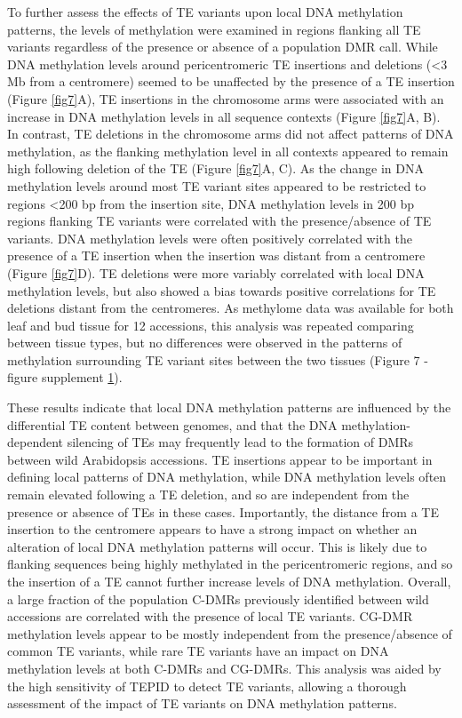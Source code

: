 \documentclass[12pt]{article}
\begin{document}
To further assess the effects of TE variants upon local DNA
methylation patterns, the levels of methylation were examined in
regions flanking all TE variants regardless of the presence or absence
of a population DMR call. While DNA methylation levels around
pericentromeric TE insertions and deletions (\textless{}3 Mb from a
centromere) seemed to be unaffected by the presence of a TE insertion
(Figure \ref{fig7}A), TE insertions in the chromosome arms were
associated with an increase in DNA methylation levels in all sequence
contexts (Figure \ref{fig7}A, B). In contrast, TE deletions in the
chromosome arms did not affect patterns of DNA methylation, as the
flanking methylation level in all contexts appeared to remain high
following deletion of the TE (Figure \ref{fig7}A, C). As the change in
DNA methylation levels around most TE variant sites appeared to be
restricted to regions \textless{}200 bp from the insertion site, DNA
methylation levels in 200 bp regions flanking TE variants were
correlated with the presence/absence of TE variants. DNA methylation
levels were often positively correlated with the presence of a TE
insertion when the insertion was distant from a centromere (Figure
\ref{fig7}D). TE deletions were more variably correlated with local
DNA methylation levels, but also showed a bias towards positive
correlations for TE deletions distant from the centromeres. As
methylome data was available for both leaf and bud tissue for 12
accessions, this analysis was repeated comparing between tissue types,
but no differences were observed in the patterns of methylation
surrounding TE variant sites between the two tissues (Figure 7 -
figure supplement \hyperref[fig7s1]{1}).

These results indicate that local DNA methylation patterns are
influenced by the differential TE content between genomes, and that the
DNA methylation-dependent silencing of TEs may frequently lead to the
formation of DMRs between wild Arabidopsis accessions. TE insertions
appear to be important in defining local patterns of DNA methylation,
while DNA methylation levels often remain elevated following a TE
deletion, and so are independent from the presence or absence of TEs in
these cases. Importantly, the distance from a TE insertion to the
centromere appears to have a strong impact on whether an alteration of
local DNA methylation patterns will occur. This is likely due to
flanking sequences being highly methylated in the pericentromeric
regions, and so the insertion of a TE cannot further increase levels of
DNA methylation. Overall, a large fraction of the population C-DMRs
previously identified between wild accessions are correlated with the
presence of local TE variants. CG-DMR methylation levels appear to be
mostly independent from the presence/absence of common TE variants,
while rare TE variants have an impact on DNA methylation levels at both
C-DMRs and CG-DMRs. This analysis was aided by the high sensitivity of
TEPID to detect TE variants, allowing a thorough assessment of the
impact of TE variants on DNA methylation patterns.
\end{document}
